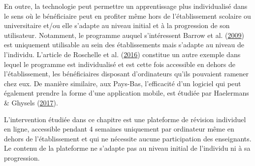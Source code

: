 \documentclass[
]{book}
\begin{document}
En outre, la technologie peut permettre un apprentissage plus individualisé dans le sens où le bénéficiaire peut en profiter même hors de l'établissement scolaire ou universitaire et/ou elle s'adapte au niveau initial et à la progression de son utilisateur. Notamment, le programme auquel s'intéressent Barrow et al. (\protect\hyperlink{ref-BAR:eal:09}{2009}) est uniquement utilisable au sein des établissements mais s'adapte au niveau de l'individu. L'article de Roschelle et al. (\protect\hyperlink{ref-ROS:eal:16}{2016}) constitue un autre exemple dans lequel le programme est individualisé et est cette fois accessible en dehors de l'établissement, les bénéficiaires disposant d'ordinateurs qu'ils pouvaient ramener chez eux. De manière similaire, aux Pays-Bas, l'efficacité d'un logiciel qui peut également prendre la forme d'une application mobile, est étudiée par Haelermans \& Ghysels (\protect\hyperlink{ref-HAE:GHY:17}{2017}).

L'intervention étudiée dans ce chapitre est une plateforme de révision individuel en ligne, accessible pendant 4 semaines uniquement par ordinateur même en dehors de l'établissement et qui ne nécessite aucune participation des enseignants. Le contenu de la plateforme ne s'adapte pas au niveau initial de l'individu ni à sa progression.
\end{document}
